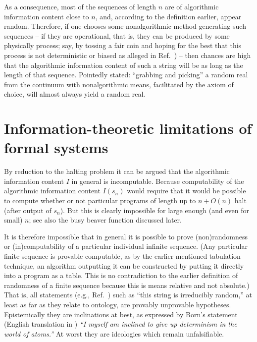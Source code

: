 As a consequence, most of the sequences of length $n$ are of algorithmic information content close to $n$, and,
according to the definition earlier, appear random.
Therefore, if one chooses some nonalgorithmic method generating such sequences --
if they are operational, that is, they can be produced by some physically process;
say, by tossing a fair coin and hoping for the best that this process is
not deterministic or biased as alleged in Ref.~\cite{diaconis:211})
--
then chances are high that the algorithmic information content of such a string will be as long as the length of that sequence.
Pointedly stated: ``grabbing and picking'' a random real from the continuum with nonalgorithmic means,
facilitated by the axiom of choice,
will almost always yield a random real.


\section{Information-theoretic limitations of formal systems}
\label{2016-pu-book-chapter-ranform-itlfs}

By reduction to the halting problem it can be argued that the algorithmic information content $I$  in general is incomputable.
Because computability of  the algorithmic information content $I(s_n)$ would require that it would be possible to compute
whether or not particular programs of length up to $n+O(n)$  halt (after output of $s_n$). But this is clearly impossible for large enough
(and even for small) $n$; see also the busy beaver function discussed later.

It is therefore impossible that in general it is possible to prove (non)randomness or (in)computability of a particular individual infinite sequence.
(Any particular finite sequence is provable computable, as by the earlier mentioned tabulation technique,
an algorithm outputting it can be constructed by putting it directly into a program as a table.
This is no contradiction to the earlier definition of randomness of a finite sequence because this is means relative and not absolute.)
That is, all statements (e.g., Ref.~\cite{zeil-05_nature_ofQuantum})
such as ``this string is irreducibly random,'' at least as far as they relate to ontology, are
provably unprovable hypotheses. Epistemically they are inclinations at best, as expressed by Born's statement~\cite[p.~866]{born-26-1}
(English translation in \cite[p.~54]{wheeler-Zurek:83})
{\em ``I myself am inclined  to give up determinism in the world of atoms.''}
At worst they are ideologies which remain unfalsifiable.

